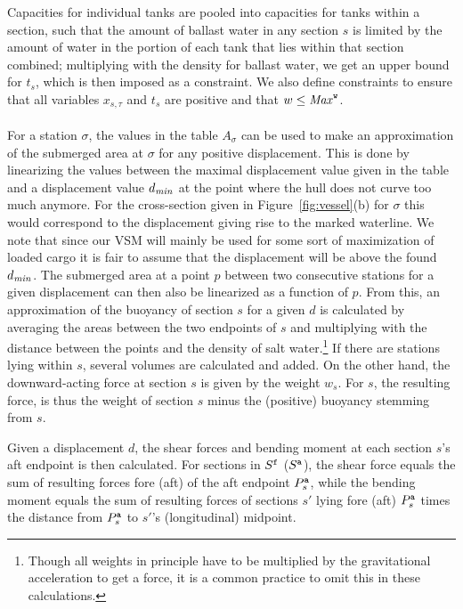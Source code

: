 Capacities for individual tanks are pooled into capacities for tanks within a section, such that the amount of ballast water in any section $s$ is limited by the amount of water in the portion of each tank that lies within that section combined; multiplying with the density for ballast water, we get an upper bound for $t_s$, which is then imposed as a constraint.
We also define constraints to ensure that all variables $x_{s,\tau}$ and $t_s$ are positive and that $w\leq\mathit{Max}^{\texttt{w}}$. 
\\\\
For a station $\sigma$, the values in the table $A_{\sigma}$ can be used to make an approximation of the submerged area at $\sigma$ for any positive displacement. This is done by linearizing the values between the maximal displacement value given in the table and a displacement value $d_\mathit{min}$ at the point where the hull does not curve too much anymore. For the cross-section given in Figure~\ref{fig:vessel}(b) for $\sigma$ this would correspond to the displacement giving rise to the marked waterline.
We note that since our VSM will mainly be used for some sort of maximization of loaded cargo it is fair to assume that the displacement will be above the found $d_\mathit{min}$.
The submerged area at a point $p$ between two consecutive stations for a given displacement can then also be linearized as a function of $p$. 
From this, an approximation of the buoyancy of section $s$ for a given $d$ is calculated by averaging the areas between the two endpoints of $s$ and multiplying with the distance between the points and the density of salt water.\footnote{Though all weights in principle have to be multiplied by the gravitational acceleration to get a force, it is a common practice to omit this in these calculations.} If there are stations lying within $s$, several volumes are calculated and added.
On the other hand, the downward-acting force at section $s$ is given by the weight $w_s$. For $s$, the resulting force, is thus the weight of section $s$ minus the (positive) buoyancy stemming from $s$.  
  
Given a displacement $d$, the shear forces and bending moment at each section $s$'s aft endpoint is then calculated. For sections in $S^{\texttt{f}}$ ($S^{\texttt{a}}$), the shear force  equals the sum of resulting forces fore (aft) of the aft endpoint $P^{\texttt{a}}_s$, while the bending moment equals the sum of resulting forces of sections $s'$ lying fore (aft) $P^{\texttt{a}}_s$ times the distance from $P^{\texttt{a}}_s$ to $s'$'s (longitudinal) midpoint.

